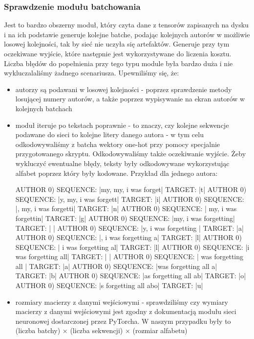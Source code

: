 \subsubsection{Sprawdzenie modułu batchowania}
	  Jest to bardzo obszerny moduł, który czyta dane z tensorów zapisanych na dysku
	  i na ich podstawie generuje kolejne batche, podając kolejnych autorów w możliwie losowej kolejności, tak by sieć
	  nie uczyła się artefaktów. Generuje przy tym oczekiwane wyjście, które następnie jest wykorzystywane do
	  liczenia kosztu. Liczba błędów do popełnienia przy tego typu module była bardzo duża i nie wykluczalaliśmy
	  żadnego scenariusza. Upewniliśmy się, że:
	\begin{itemize}
	  \item {autorzy są podawani w losowej kolejności - poprzez sprawdzenie metody losującej numery autorów,
	  a także poprzez wypisywanie na ekran autorów w kolejnych batchach}
	  \item {moduł iteruje po tekstach poprawnie - to znaczy, czy kolejne sekwencje podawane do sieci to
	  kolejne litery danego autora - w tym celu odkodowywaliśmy z batcha wektory one-hot przy pomocy
	  specjalnie przygotowanego skryptu. Odkodowywaliśmy także oczekiwanie wyjście. Żeby wykluczyć ewentualne błędy,
	  teksty były odkodowywane wykorzystując alfabet poprzez który były kodowane.
	  Przykład dla jednego autora:
\begin{bash}
AUTHOR 0) SEQUENCE: |my, my, i was forget|     TARGET: |t|
AUTHOR 0) SEQUENCE: |y, my, i was forgett|     TARGET: |i|
AUTHOR 0) SEQUENCE: |, my, i was forgetti|     TARGET: |n|
AUTHOR 0) SEQUENCE: | my, i was forgettin|     TARGET: |g|
AUTHOR 0) SEQUENCE: |my, i was forgetting|     TARGET: | |
AUTHOR 0) SEQUENCE: |y, i was forgetting |     TARGET: |a|
AUTHOR 0) SEQUENCE: |, i was forgetting a|     TARGET: |l|
AUTHOR 0) SEQUENCE: | i was forgetting al|     TARGET: |l|
AUTHOR 0) SEQUENCE: |i was forgetting all|     TARGET: | |
AUTHOR 0) SEQUENCE: | was forgetting all |     TARGET: |a|
AUTHOR 0) SEQUENCE: |was forgetting all a|     TARGET: |b|
AUTHOR 0) SEQUENCE: |as forgetting all ab|     TARGET: |o|
AUTHOR 0) SEQUENCE: |s forgetting all abo|     TARGET: |u|
\end{bash} }
	  \item {rozmiary macierzy z danymi wejściowymi - sprawdziliśmy czy wymiary macierzy z danymi wejściowymi jest zgodny
	  z dokumentacją modułu sieci neuronowej dostarczonej przez PyTorcha. W naszym przypadku były to
	  (liczba batchy) $\times$ (liczba sekwencji) $\times$ (rozmiar alfabetu) }
	\end{itemize}

